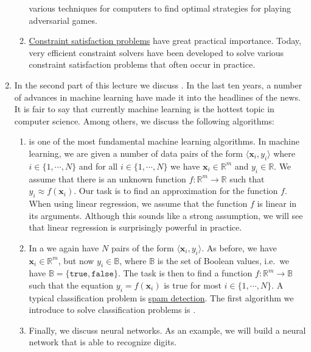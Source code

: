 \begin{enumerate}
\begin{enumerate}
            various techniques for computers to find optimal strategies for playing adversarial games.
      \item \href{https://en.wikipedia.org/wiki/Constraint_satisfaction_problem}{Constraint satisfaction problems} 
            have great practical importance.  Today, very efficient constraint solvers have been developed to
            solve various constraint satisfaction problems that often occur in practice.
      \end{enumerate}
\item In the second part of this lecture we discuss .  In the last ten years, a number of
      advances in machine learning have made it into the headlines of the news.  It is fair to say that
      currently machine learning is the hottest topic in computer science.  Among others, we discuss the following
      algorithms:
      \begin{enumerate}
      \item {} is one of the most fundamental machine learning algorithms.
            In machine learning, we are given a number of data pairs of the form  $\langle \mathbf{x}_i, y_i \rangle$ 
            where $i \in \{1,\cdots,N\}$ and for all $i \in \{1,\cdots,N\}$ we have $\mathbf{x}_i \in \mathbb{R}^m$
            and $y_i \in \mathbb{R}$.  We assume that there is an unknown function $f:\mathbb{R}^m \rightarrow \mathbb{R}$
            such that $y_i \approx f(\mathbf{x}_i)$.  Our task is to find an approximation for the function
            $f$.  When using linear regression, we assume that the function $f$ is linear in its arguments.
            Although this sounds like a strong assumption, we will see that linear regression is surprisingly
            powerful in practice.
      \item In a  we again have $N$ pairs of the form $\langle \mathbf{x}_i, y_i
        \rangle$.
            As before,  we have $\mathbf{x}_i \in \mathbb{R}^m$, but now $y_i \in \mathbb{B}$, where
            $\mathbb{B}$ is the set of Boolean values, i.e.~we have $\mathbb{B} = \{\mathtt{true}, \mathtt{false}\}$.
            The task is then to find a function $f:\mathbb{R}^m \rightarrow \mathbb{B}$
            such that the equation $y_i = f(\mathbf{x}_i)$ is true for most $i\in\{1,\cdots,N\}$.  A typical
            classification problem is \href{https://en.wikipedia.org/wiki/Email_spam}{spam detection}.  The
            first algorithm we introduce to solve classification problems is .
      \item Finally, we discuss neural networks.  As an example, we will build a neural network that is able to
            recognize digits. 
      \end{enumerate}
\end{enumerate}
\pagebreak


